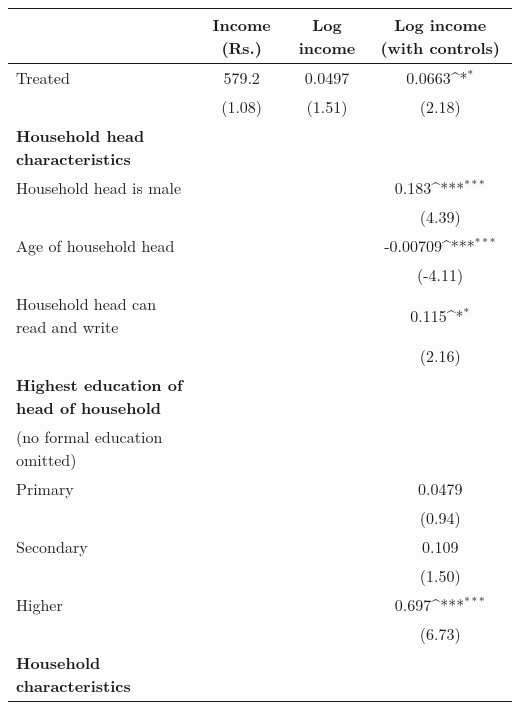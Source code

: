 {
\def\sym#1{\ifmmode^{#1}\else\(^{#1}\)\fi}
\begin{tabular}{l*{3}{c}}
\hline\hline
                    &\multicolumn{1}{c}{Income (Rs.)}&\multicolumn{1}{c}{Log income}&\multicolumn{1}{c}{Log income (with controls)}\\
\hline
Treated             &       579.2         &      0.0497         &      0.0663\sym{*}  \\
                    &      (1.08)         &      (1.51)         &      (2.18)         \\
[1em]
\textbf{Household head characteristics}&                     &                     &                     \\
[1em]
Household head is male&                     &                     &       0.183\sym{***}\\
                    &                     &                     &      (4.39)         \\
[1em]
Age of household head&                     &                     &    -0.00709\sym{***}\\
                    &                     &                     &     (-4.11)         \\
[1em]
Household head can read and write&                     &                     &       0.115\sym{*}  \\
                    &                     &                     &      (2.16)         \\
[1em]
\textbf{Highest education of head of household} \\ (no formal education omitted)&                     &                     &                     \\
[1em]
Primary             &                     &                     &      0.0479         \\
                    &                     &                     &      (0.94)         \\
[1em]
Secondary           &                     &                     &       0.109         \\
                    &                     &                     &      (1.50)         \\
[1em]
Higher              &                     &                     &       0.697\sym{***}\\
                    &                     &                     &      (6.73)         \\
[1em]
\textbf{Household characteristics}&                     &                     &                     \\

\end{tabular}}
